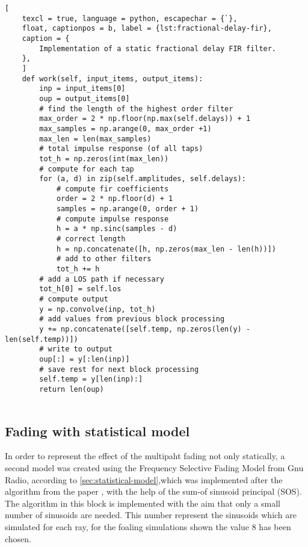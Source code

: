 \begin{lstlisting}[
	texcl = true, language = python, escapechar = {`},
	float, captionpos = b, label = {lst:fractional-delay-fir},
	caption = {
		Implementation of a static fractional delay FIR filter.
	},
	]
	def work(self, input_items, output_items):
		inp = input_items[0]
		oup = output_items[0]
		# find the length of the highest order filter
		max_order = 2 * np.floor(np.max(self.delays)) + 1
		max_samples = np.arange(0, max_order +1)
		max_len = len(max_samples)
		# total impulse response (of all taps)
		tot_h = np.zeros(int(max_len))
		# compute for each tap
		for (a, d) in zip(self.amplitudes, self.delays):
			# compute fir coefficients
			order = 2 * np.floor(d) + 1
			samples = np.arange(0, order + 1)
			# compute impulse response
			h = a * np.sinc(samples - d)
			# correct length
			h = np.concatenate([h, np.zeros(max_len - len(h))])
			# add to other filters
			tot_h += h
		# add a LOS path if necessary
		tot_h[0] = self.los
		# compute output
		y = np.convolve(inp, tot_h)
		# add values from previous block processing
		y += np.concatenate([self.temp, np.zeros(len(y) - len(self.temp))])
		# write to output
		oup[:] = y[:len(inp)]
		# save rest for next block processing
		self.temp = y[len(inp):]
		return len(oup)
	
\end{lstlisting}

%
%	
%
% 	

\subsection{Fading with statistical model}

In order to represent the effect of the multipaht fading not only statically, a second model was created using the Frequency Selective Fading Model from Gnu Radio, according to \ref{sec:statistical-model},which was implemented after the algorithm from the paper \cite{Alimohammad2009}, with the help of the sum-of sinusoid principal (SOS). The algorithm in this block is implemented with the aim that only a small number of sinusoids are needed. 
This number represent the sinusoids which are simulated for each ray, for the foaling simulations shown the value 8 has been chosen.

